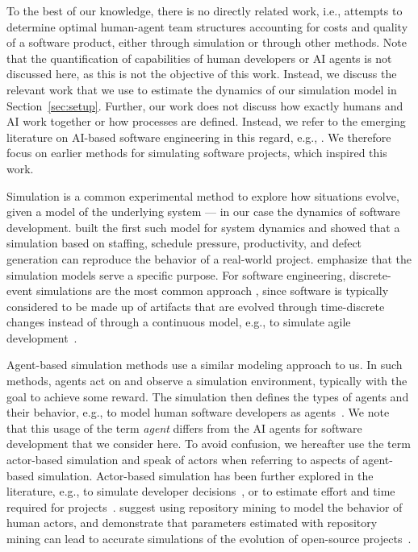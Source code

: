 \documentclass[smallextended]{svjour3}       %
\begin{document}
To the best of our knowledge, there is no directly related work, i.e., attempts to determine optimal human-agent team structures accounting for costs and quality of a software product, either through simulation or through other methods. Note that the quantification of capabilities of human developers or AI agents is not discussed here, as this is not the objective of this work. Instead, we discuss the relevant work that we use to estimate the dynamics of our simulation model in Section~\ref{sec:setup}. Further, our work does not discuss how exactly humans and AI work together or how processes are defined. Instead, we refer to the emerging literature on AI-based software engineering in this regard, e.g., \cite{hassan2026ainative, hassan2025agentic, li2025aiteammates}. We therefore focus on earlier methods for simulating software projects, which inspired this work. 


Simulation is a common experimental method to explore how situations evolve, given a model of the underlying system --- in our case the dynamics of software development. \cite{abdelhamid1991dynamics} built the first such model for system dynamics and showed that a simulation based on staffing, schedule pressure, productivity, and defect generation can reproduce the behavior of a real-world project. \cite{kellner1999simulation} emphasize that the simulation models serve a specific purpose. For software engineering, discrete-event simulations are the most common approach \citep{zhang2008reflections,garciagarcia2020simulation}, since software is typically considered to be made up of artifacts that are evolved through time-discrete changes instead of through a continuous model, e.g., to simulate agile development~\citep{cao2010agile}. 

Agent-based simulation methods use a similar modeling approach to us. In such methods, agents act on and observe a simulation environment, typically with the goal to achieve some reward. The simulation then defines the types of agents and their behavior, e.g., to model human software developers as agents~\citep{smith2006agentbased}. We note that this usage of the term \textit{agent} differs from the AI agents for software development that we consider here. To avoid confusion, we hereafter use the term actor-based simulation and speak of actors when referring to aspects of agent-based simulation. 
Actor-based simulation has been further explored in the literature, e.g., to simulate developer decisions~\citep{agarwal2010flexible}, or to estimate effort and time required for projects~\citep{spasic2012avl}. \cite{honsel2015mining} suggest using repository mining to model the behavior of human actors, and demonstrate that parameters estimated with repository mining can lead to accurate simulations of the evolution of open-source projects~\citep{honsel2021investigation}. 
\end{document}
